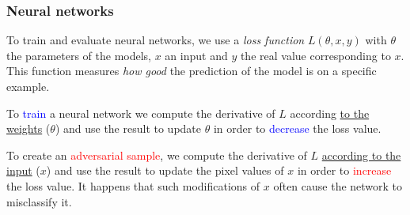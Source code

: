 \documentclass[9pt]{beamer}
\begin{document}












\begin{frame}
  \frametitle{Neural networks}

  To train and evaluate neural networks, we use a \emph{loss function}
  $L(\theta, x, y)$ with $\theta$ the parameters of the models, $x$ an input and
  $y$ the real value corresponding to $x$. This function measures
  \emph{how good} the prediction of the model is on a specific
  example.

  \bigskip

  \pause

  To \textcolor{blue}{train} a neural network we compute the
  derivative of $L$ according \underline{to the weights} ($\theta$) and use
  the result to update $\theta$ in order to \textcolor{blue}{decrease} the
  loss value.

  \bigskip

  \pause

  To create an \textcolor{red}{adversarial sample}, we compute the
  derivative of $L$ \underline{according to the input} ($x$) and use
  the result to update the pixel values of $x$ in order to
  \textcolor{red}{increase} the loss value. It happens that such
  modifications of $x$ often cause the network to misclassify it.
\end{frame}
\end{document}
